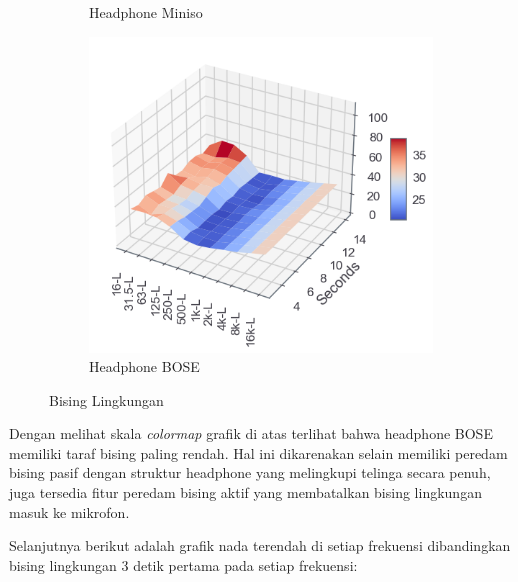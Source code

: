 \documentclass[12pt,]{article}
\begin{document}
\begin{itemize}
\begin{figure}[!ht]
\begin{subfigure}[b]{0.3\textwidth}
				\caption{Headphone Miniso}
			\end{subfigure}
			\begin{subfigure}[b]{0.3\textwidth}
				\includegraphics[width=\textwidth]{images/graph/nounitbose}
				\caption{Headphone BOSE}
			\end{subfigure}
			\caption{Bising Lingkungan}
		\end{figure}
	
		Dengan melihat skala \textit{colormap} grafik di atas terlihat bahwa headphone BOSE memiliki taraf bising paling rendah.
		Hal ini dikarenakan selain memiliki peredam bising pasif dengan struktur headphone yang melingkupi telinga secara penuh,
		juga tersedia fitur peredam bising aktif yang membatalkan bising lingkungan masuk ke mikrofon.
		
		\newpage
		Selanjutnya berikut adalah grafik nada terendah di setiap frekuensi dibandingkan bising lingkungan 3 detik pertama pada setiap frekuensi:
		

\end{itemize}
\end{document}

